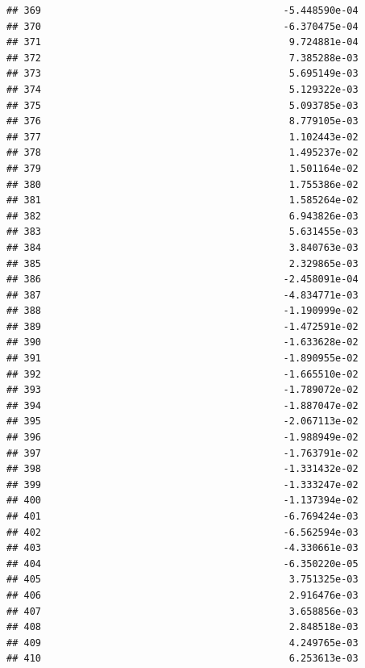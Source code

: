 \documentclass[
]{article}
\begin{document}
\begin{verbatim}
## 369                                          -5.448590e-04
## 370                                          -6.370475e-04
## 371                                           9.724881e-04
## 372                                           7.385288e-03
## 373                                           5.695149e-03
## 374                                           5.129322e-03
## 375                                           5.093785e-03
## 376                                           8.779105e-03
## 377                                           1.102443e-02
## 378                                           1.495237e-02
## 379                                           1.501164e-02
## 380                                           1.755386e-02
## 381                                           1.585264e-02
## 382                                           6.943826e-03
## 383                                           5.631455e-03
## 384                                           3.840763e-03
## 385                                           2.329865e-03
## 386                                          -2.458091e-04
## 387                                          -4.834771e-03
## 388                                          -1.190999e-02
## 389                                          -1.472591e-02
## 390                                          -1.633628e-02
## 391                                          -1.890955e-02
## 392                                          -1.665510e-02
## 393                                          -1.789072e-02
## 394                                          -1.887047e-02
## 395                                          -2.067113e-02
## 396                                          -1.988949e-02
## 397                                          -1.763791e-02
## 398                                          -1.331432e-02
## 399                                          -1.333247e-02
## 400                                          -1.137394e-02
## 401                                          -6.769424e-03
## 402                                          -6.562594e-03
## 403                                          -4.330661e-03
## 404                                          -6.350220e-05
## 405                                           3.751325e-03
## 406                                           2.916476e-03
## 407                                           3.658856e-03
## 408                                           2.848518e-03
## 409                                           4.249765e-03
## 410                                           6.253613e-03

\end{verbatim}
\end{document}
